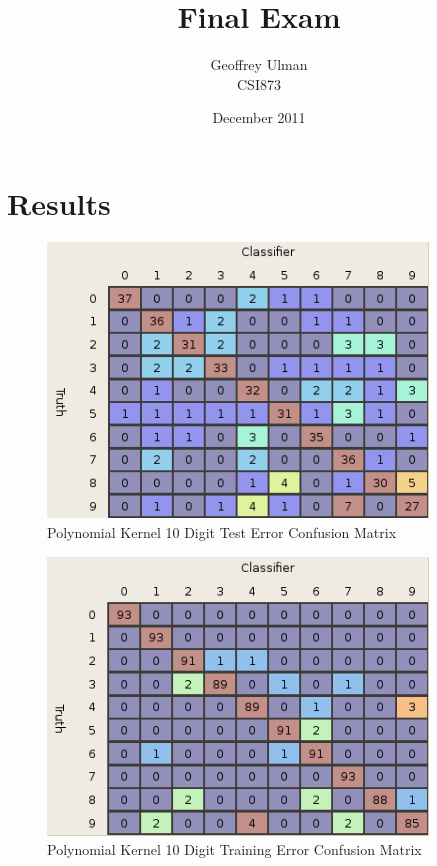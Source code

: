 \documentclass{article}
\begin{document}
\title{Final Exam}
\author{Geoffrey Ulman\\
        CSI873}
\date{December 2011}
\maketitle

\section{Results}\label{Results}

\begin{figure}
\centering
\includegraphics[width=0.9\textwidth]{images/poly_all_confusion_test.png}
\caption{Polynomial Kernel 10 Digit Test Error Confusion Matrix}
\label{poly10testconfusion}
\end{figure}

\begin{figure}
\centering
\includegraphics[width=0.9\textwidth]{images/poly_all_confusion_training.png}
\caption{Polynomial Kernel 10 Digit Training Error Confusion Matrix}
\label{poly10trainconfusion}
\end{figure}
\end{document}
